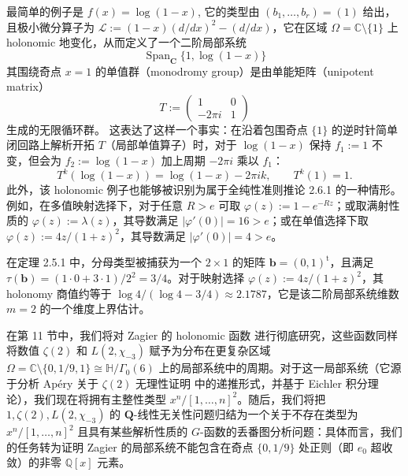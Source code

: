 \begin{remark}\label{rem:2.6.3}
最简单的例子是 $f(x) = \log(1-x)$, 它的类型由 $(b_1, \ldots, b_r) = (1)$ 给出，且极小微分算子为 $\mathcal{L} := (1-x)(d/dx)^2 - (d/dx)$，它在区域 $\Omega = \mathbb{C} \setminus \{1\}$ 上 holonomic 地变化，从而定义了一个二阶局部系统
\[ \operatorname{Span}_{\mathbf{C}} \{ 1, \log(1-x) \} \]
其围绕奇点 $x=1$ 的单值群（monodromy group）是由单能矩阵（unipotent matrix）
\begin{equation*}
T := \left( \begin{array}{cc} 1 & 0 \\ -2\pi i & 1 \end{array} \right)
\end{equation*}
生成的无限循环群。
这表达了这样一个事实：在沿着包围奇点 $\{1\}$ 的逆时针简单闭回路上解析开拓 $T$（局部单值算子）时，对于 $\log(1-x)$ 保持 $f_1 := 1$ 不变，但会为 $f_2 := \log(1-x)$ 加上周期 $-2\pi i$ 乘以 $f_1$：
\begin{equation*}
T^{k}(\log(1-x)) = \log(1-x) - 2\pi i k, \qquad T^{k}(1) = 1.
\end{equation*}
此外，该 holonomic 例子也能够被识别为属于全纯性准则推论 2.6.1 的一种情形。例如，在多值映射选择下，对于任意 $R > e$ 可取 $\varphi(z) := 1 - e^{-Rz}$；或取满射性质的 $\varphi(z) := \lambda(z)$，其导数满足 $|\varphi'(0)| = 16 > e$；或在单值选择下取 $\varphi(z) := 4z/(1+z)^2$，其导数满足 $|\varphi'(0)| = 4 > e$。

在定理 2.5.1 中，分母类型被捕获为一个 $2 \times 1$ 的矩阵 $\mathbf{b} = (0,1)^{\mathrm{t}}$，且满足 $\tau(\mathbf{b}) = (1 \cdot 0 + 3 \cdot 1)/2^2 = 3/4$。对于映射选择 $\varphi(z) := 4z/(1+z)^2$，其 holonomy 商值约等于 $\log 4/(\log 4 - 3/4) \approx 2.1787$，它是该二阶局部系统维数 $m=2$ 的一个维度上界估计。
\end{remark}

在第 11 节中，我们将对 Zagier 的 holonomic 函数 \cite{Zag09} 进行彻底研究，这些函数同样将数值 $\zeta(2)$ 和 $L(2,\chi_{-3})$ 赋予为分布在更复杂区域 $\Omega = \mathbb{C} \setminus \{0,1/9,1\} \cong \mathbb{H}/\Gamma_0(6)$ 上的局部系统中的周期。对于这一局部系统（它源于分析 Ap{\'e}ry 关于 $\zeta(2)$ 无理性证明 \cite{Ape79}\cite{Coh78}\cite{vdP79} 中的递推形式，并基于 Eichler 积分理论），我们现在将拥有主整性类型 $x^n/[1,\ldots,n]^2$。随后，我们将把 $1, \zeta(2), L(2,\chi_{-3})$ 的 $\mathbf{Q}$-线性无关性问题归结为一个关于不存在类型为 $x^n/[1,\ldots,n]^2$ 且具有某些解析性质的 $G$-函数的丢番图分析问题：具体而言，我们的任务转为证明 Zagier 的局部系统不能包含在奇点 $\{0,1/9\}$ 处正则（即 $e_0$ 超收敛）的非零 $\mathbb{Q}[x]$ 元素。

